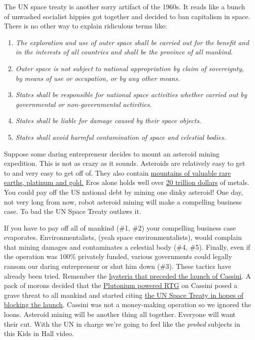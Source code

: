 The UN space treaty is another sorry artifact of the 1960s. It reads
like a bunch of unwashed socialist hippies got together and decided to
ban capitalism in space. There is no other way to explain ridiculous
terms like:

\begin{enumerate}
\item
  \emph{The exploration and use of outer space shall be carried out for
  the benefit and in the interests of all countries and shall be the
  province of all mankind}.
\item
  \emph{Outer space is not subject to national appropriation by claim of
  sovereignty, by means of use or occupation, or by any other means.}
\item
  \emph{States shall be responsible for national space activities
  whether carried out by governmental or non-governmental activities.}
\item
  \emph{States shall be liable for damage caused by their space
  objects.}
\item
  \emph{States shall avoid harmful contamination of space and celestial
  bodies.}
\end{enumerate}
Suppose some daring entrepreneur decides to mount an asteroid mining
expedition. This is not as crazy as it sounds. Asteroids are relatively
easy to get to and very easy to get off of. They also contain
\href{http://news.bbc.co.uk/2/hi/sci/tech/401227.stm}{mountains of
valuable rare earths, platinum and gold.} Eros alone holds well over
\href{http://www.suite101.com/content/economic-impact-of-asteroids-space-exploration-a187015}{20
trillion dollars} of metals. You could pay off the US national debt by
mining one dinky asteroid! One day, not very long from now, robot
asteroid mining will make a compelling business case. To bad the UN
Space Treaty outlaws it.

If you have to pay off all of mankind (\#1, \#2) your compelling
business case evaporates. Environmentalists, (yeah space
environmentalists), would complain that mining damages and contaminates
a celestial body (\#4, \#5). Finally, even if the operation was 100\%
privately funded, various governments could legally ransom our daring
entrepreneur or shut him down (\#3). These tactics have already been
tried. Remember the
\href{http://articles.latimes.com/1997/oct/01/local/me-37979}{hysteria
that preceded the launch of Cassini}. A pack of morons decided that the
\href{http://en.wikipedia.org/wiki/Radioisotope\_thermoelectric\_generator}{Plutonium
powered RTG} on Cassini posed a grave threat to all mankind and started
citing \href{http://www.animatedsoftware.com/cassini/trea9704.htm}{the
UN Space Treaty in hopes of blocking the launch}. Cassini was not a
money-making operation so we ignored the loons. Asteroid mining will be
another thing all together. Everyone will want their cut. With the UN in
charge we're going to feel like the \emph{probed} subjects in this Kids
in Hall video.

